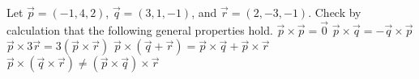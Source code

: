 
\begin{Exercise}[
name={},
title={}, 
difficulty=0,
origin={\cite{SM}}]
Let $\vec{p}=(-1,4,2)$, $\vec{q}=(3,1,-1)$, and $\vec{r}=(2,-3,-1)$. Check by calculation that the following general properties hold.
\Question $\vec{p}\times\vec{p}=\vec{0}$
\Question $\vec{p}\times\vec{q}=-\vec{q}\times\vec{p}$
\Question $\vec{p}\times3\vec{r}=3(\vec{p}\times\vec{r})$
\Question $\vec{p}\times(\vec{q}+\vec{r})=\vec{p}\times\vec{q}+\vec{p}\times\vec{r}$
\Question $\vec{p}\times(\vec{q}\times\vec{r})\neq(\vec{p}\times\vec{q})\times\vec{r}$
\end{Exercise}

\begin{Answer}
\end{Answer}
